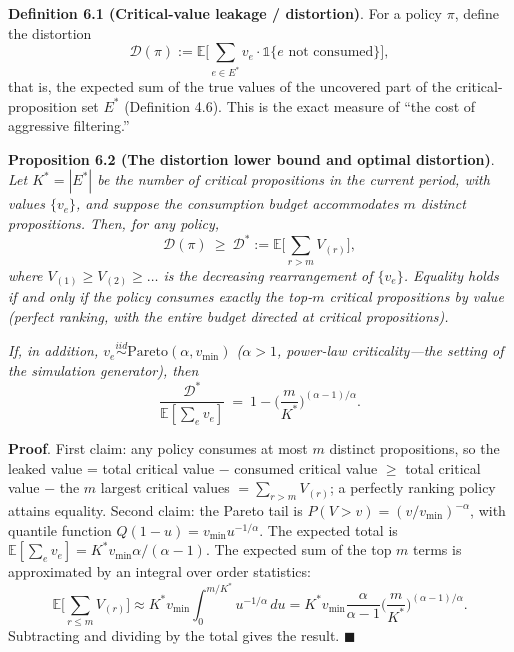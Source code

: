 \documentclass[
  11pt]{article}
\begin{document}
\textbf{Definition 6.1 (Critical-value leakage / distortion)}. For a
policy \(\pi\), define the distortion
\[\mathcal{D}(\pi) := \mathbb{E}\Big[\sum_{e \in E^*} v_e \cdot \mathbb{1}\{e \text{ not consumed}\}\Big],\]
that is, the expected sum of the true values of the uncovered part of
the critical-proposition set \(E^*\) (Definition 4.6). This is the exact
measure of ``the cost of aggressive filtering.''

\textbf{Proposition 6.2 (The distortion lower bound and optimal
distortion)}. \emph{Let \(K^* = |E^*|\) be the number of critical
propositions in the current period, with values \(\{v_e\}\), and suppose
the consumption budget accommodates \(m\) distinct propositions. Then,
for any policy,}
\[\mathcal{D}(\pi) \ \ge\ \mathcal{D}^* := \mathbb{E}\Big[\sum_{r > m} V_{(r)}\Big],\]
\emph{where \(V_{(1)} \ge V_{(2)} \ge \dots\) is the decreasing
rearrangement of \(\{v_e\}\). Equality holds if and only if the policy
consumes exactly the top-\(m\) critical propositions by value (perfect
ranking, with the entire budget directed at critical propositions).}

\emph{If, in addition,
\(v_e \stackrel{iid}{\sim} \mathrm{Pareto}(\alpha, v_{\min})\)
(\(\alpha > 1\), power-law criticality---the setting of the simulation
generator), then}
\[\frac{\mathcal{D}^*}{\mathbb{E}[\sum_e v_e]} \ =\ 1 - \Big(\frac{m}{K^*}\Big)^{(\alpha-1)/\alpha}.\]

\textbf{Proof}. First claim: any policy consumes at most \(m\) distinct
propositions, so the leaked value = total critical value − consumed
critical value \(\ge\) total critical value − the \(m\) largest critical
values \(= \sum_{r>m} V_{(r)}\); a perfectly ranking policy attains
equality. Second claim: the Pareto tail is
\(P(V > v) = (v/v_{\min})^{-\alpha}\), with quantile function
\(Q(1-u) = v_{\min} u^{-1/\alpha}\). The expected total is
\(\mathbb{E}[\sum_e v_e] = K^* v_{\min} \alpha/(\alpha - 1)\). The
expected sum of the top \(m\) terms is approximated by an integral over
order statistics:
\[\mathbb{E}\Big[\sum_{r \le m} V_{(r)}\Big] \approx K^* v_{\min} \int_0^{m/K^*} u^{-1/\alpha}\, du = K^* v_{\min} \frac{\alpha}{\alpha-1}\Big(\frac{m}{K^*}\Big)^{(\alpha-1)/\alpha}.\]
Subtracting and dividing by the total gives the result. \(\blacksquare\)
\end{document}
